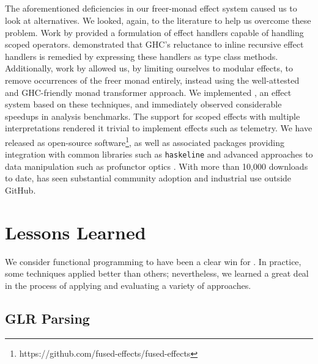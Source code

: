\documentclass[acmsmall,fleqn]{acmart}
\begin{document}
\subsection{\fe{}}

The aforementioned deficiencies in our freer-monad effect system caused us
to look at alternatives. We looked, again, to the literature to help us
overcome these problem. Work by \citet{wu2014effect} provided a formulation
of effect handlers capable of handling scoped operators. \citet{wu15fusion}
demonstrated that GHC's reluctance to inline recursive effect handlers is
remedied by expressing these handlers as type class methods. Additionally,
work by \citet{Schrijvers19Monad} allowed us, by limiting ourselves to
modular effects, to remove occurrences of the freer monad entirely, instead
using the well-attested and GHC-friendly monad transformer approach. We
implemented \fe{}, an effect system based on these techniques, and
immediately observed considerable speedups in analysis benchmarks. The \fe{}
support for scoped effects with multiple interpretations rendered it trivial
to implement effects such as telemetry. We have released \fe{} as
open-source
software\footnote{https://github.com/fused-effects/fused-effects}, as well
as associated packages providing integration with common libraries such as
\texttt{haskeline} and advanced approaches to data manipulation such as
profunctor optics \cite{Pickering17Profunctor}. With more than 10,000
downloads to date, \fe{} has seen substantial community adoption and
industrial use outside GitHub.

\section{Lessons Learned}
\label{sec:lessons}

We consider functional programming to have been a clear win for \semantic{}.
In practice, some techniques applied better than others; nevertheless, we learned
a great deal in the process of applying and evaluating a variety of approaches.

\subsection{GLR Parsing}
\end{document}
